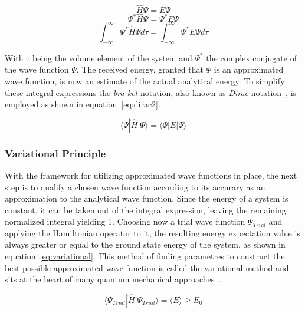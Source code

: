 \documentclass[11pt]{article}
\begin{document}
\begin{equation}
  \hat{H}\Psi = E\Psi
  \label{eq:dirac}
\end{equation}
\begin{equation*}
  \Psi^{*}\hat{H}\Psi = \Psi^{*}E\Psi
\end{equation*}
\begin{equation*}
  \int_{-\infty}^{\infty}\Psi^{*}\hat{H}\Psi d\tau = \int_{-\infty}^{\infty}\Psi^{*}E\Psi d\tau
\end{equation*}

\bigskip

\noindent With $\tau$ being the volume element of the system and $\Psi^{*}$ the complex conjugate of the wave function $\Psi$.
The received energy, granted that $\Psi$ is an approximated wave function, is now an estimate of the actual analytical energy.
To simplify these integral expressions the \textit{bra-ket} notation, also known as \textit{Dirac} notation~\cite{Dirac1939}, is employed as shown in equation~\ref{eq:dirac2}.

\begin{equation}
  \langle\Psi|\hat{H}|\Psi\rangle = \langle\Psi|E|\Psi\rangle
  \label{eq:dirac2}
\end{equation}

\bigskip

\subsubsection{Variational Principle}
With the framework for utilizing approximated wave functions in place, the next step is to qualify a chosen wave function according to its accurary as an approximation to the analytical wave function.
Since the energy of a system is constant, it can be taken out of the integral expression, leaving the remaining normalized integral yielding 1.
Choosing now a trial wave function $\Psi_{Trial}$ and applying the Hamiltonian operator to it, the resulting energy expectation value is always greater or equal to the ground state energy of the system, as shown in equation~\ref{eq:variational}.
This method of finding parametres to construct the best possible approximated wave function is called the variational method and sits at the heart of many quantum mechanical approaches~\cite{Griffiths2017}.

\begin{equation}
  \langle\Psi_{Trial}|\hat{H}|\Psi_{Trial}\rangle = \langle E\rangle \geq E_0
  \label{eq:variational}
\end{equation}
\end{document}
